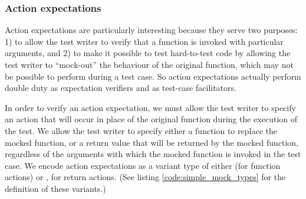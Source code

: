 \subsubsection{Action expectations}

Action expectations are particularly interesting because they serve
two purposes: 1) to allow the test writer to verify that a function is
invoked with particular arguments, and 2) to make it possible to test
hard-to-test code by allowing the test writer to ``mock-out'' the
behaviour of the original function, which may not be possible to
perform during a test case. So action expectations actually perform
double duty as expectation verifiers and as test-case facilitators.


In order to verify an action expectation, we must allow the test
writer to specify an action that will occur in place of the original
function during the execution of the test. We allow the test writer to
specify either a function to replace the mocked function, or a return
value that will be returned by the mocked function, regardless of the
arguments with which the mocked function is invoked in the test
case. We encode action expectations as a variant type of either
 (for function actions) or , for return
actions. (See listing \ref{code:simple_mock_types} for the definition
of these variants.)





